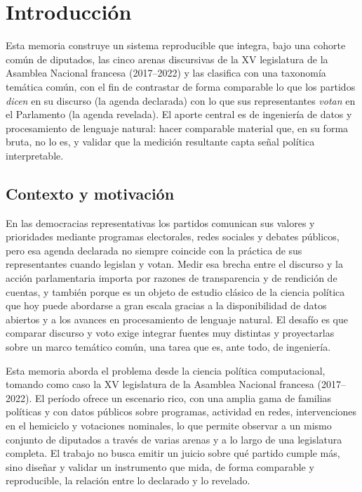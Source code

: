 \chapter{Introducción}
\label{cap:introduccion}


Esta memoria construye un sistema reproducible que integra, bajo una cohorte
común de diputados, las cinco arenas discursivas de la XV legislatura de la
Asamblea Nacional francesa (2017--2022) y las clasifica con una taxonomía
temática común, con el fin de contrastar de forma comparable lo que los partidos
\emph{dicen} en su discurso (la agenda declarada) con lo que sus representantes
\emph{votan} en el Parlamento (la agenda revelada). El aporte central es de
ingeniería de datos y procesamiento de lenguaje natural: hacer comparable
material que, en su forma bruta, no lo es, y validar que la medición resultante
capta señal política interpretable.

\section{Contexto y motivación}
\label{sec:contexto}

En las democracias representativas los partidos comunican sus valores y
prioridades mediante programas electorales, redes sociales y debates públicos,
pero esa agenda declarada no siempre coincide con la práctica de sus
representantes cuando legislan y votan. Medir esa brecha entre el discurso y la
acción parlamentaria importa por razones de transparencia y de rendición de
cuentas, y también porque es un objeto de estudio clásico de la ciencia política
que hoy puede abordarse a gran escala gracias a la disponibilidad de datos
abiertos y a los avances en procesamiento de lenguaje natural. El desafío es que
comparar discurso y voto exige integrar fuentes muy distintas y proyectarlas
sobre un marco temático común, una tarea que es, ante todo, de ingeniería.

Esta memoria aborda el problema desde la ciencia política computacional, tomando
como caso la XV legislatura de la Asamblea Nacional francesa (2017--2022). El
período ofrece un escenario rico, con una amplia gama de familias políticas y
con datos públicos sobre programas, actividad en redes, intervenciones en el
hemiciclo y votaciones nominales, lo que permite observar a un mismo conjunto de
diputados a través de varias arenas y a lo largo de una legislatura completa. El
trabajo no busca emitir un juicio sobre qué partido cumple más, sino diseñar y
validar un instrumento que mida, de forma comparable y reproducible, la relación
entre lo declarado y lo revelado.

